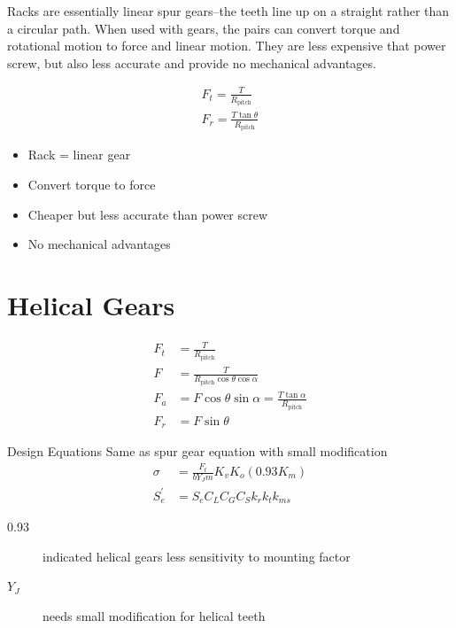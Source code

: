 \documentclass[a4paper,openany]{tufte-book}
\begin{document}
Racks are essentially linear spur gears--the teeth line up on a straight rather than a circular path. When used with gears, the pairs can convert torque and rotational motion to force and linear motion. They are less expensive that power screw, but also less accurate and provide no mechanical advantages.

\begin{align*}
  F_{t} = \frac{T}{R_{\text{pitch}}} \\
  F_{r} = \frac{T \tan \theta}{R_{\text{pitch}}}
\end{align*}

\begin{itemize}
\item Rack = linear gear

\item Convert torque to force

\item Cheaper but less accurate than power screw

\item No mechanical advantages
\end{itemize}


\chapter{Helical Gears}
\label{sec:org7f65144}

\begin{align}
    F_{t} &= \frac{T}{R_{\text{pitch}}} \\
    F &= \frac{T}{R_{\text{pitch}} \cos \theta \cos \alpha} \\
    F_{a} &= F \cos \theta \sin \alpha = \frac{T \tan \alpha}{R_{\text{pitch}}} \\
    F_{r} &= F \sin \theta
  \end{align}

Design Equations Same as spur gear equation with small modification
\begin{align}
    \sigma &= \frac{F_{t}}{bY_{J}m} K_{v} K_{o} (0.93 K_{m}) \\
    S_{e}^{\prime} &= S_{e}C_{L}C_{G}C_{S}k_{r}k_{t}k_{ms}
  \end{align}

\begin{description}
\item[{0.93}] indicated helical gears less sensitivity to mounting factor

\item[{\(Y_{J}\)}] needs small modification for helical teeth
\end{description}
\end{document}
